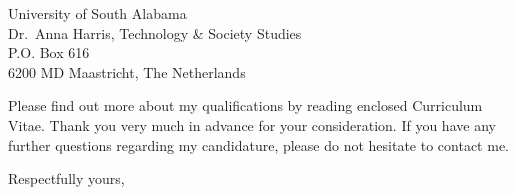 \documentclass[10pt,a4paper]{letter}
\begin{document}
\begin{letter}{University of South Alabama \\ Dr.~Anna Harris, Technology \& Society Studies \\ P.O. Box 616 \\ 6200 MD Maastricht, The Netherlands}
  
  Please find out more about my qualifications by reading enclosed Curriculum Vitae. Thank you very much in advance for your consideration. If you have any further questions regarding my candidature, please do not hesitate to contact me.
  
  
  \closing{Respectfully yours,\\
     \\
  }
  
  \end{letter} 
  
\end{document}
